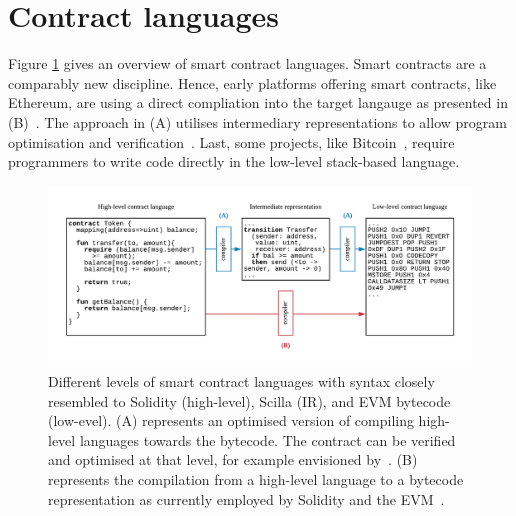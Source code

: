 \section{Contract languages}
\label{languages}

Figure \ref{fig:languagediagram} gives an overview of smart contract languages.
Smart contracts are a comparably new discipline.
Hence, early platforms offering smart contracts, like Ethereum, are using a direct compliation into the target langauge as presented in (B)~\cite{Ethereum2018Solidity,Ethereum2018Vyper}.
The approach in (A) utilises intermediary representations to allow program optimisation and verification~\cite{OCamlProSAS2018,DynamicLedgerSolutions2017,Sergey2018}. 
Last, some projects, like Bitcoin~\cite{BitcoinWiki2018Script}, require programmers to write code directly in the low-level stack-based language.





\begin{figure}
\includegraphics[width=\textwidth]{fig/Language.pdf}
\caption{Different levels of smart contract languages with syntax closely resembled to Solidity (high-level), Scilla (IR), and EVM bytecode (low-evel). (A) represents an optimised version of compiling high-level languages towards the bytecode. The contract can be verified and optimised at that level, for example envisioned by~\cite{Sergey2018,OCamlProSAS2018}. (B) represents the  compilation from a high-level language to a bytecode representation as currently employed by Solidity and the EVM~\cite{Ethereum2018Solidity,Wood2014}.}
\label{fig:languagediagram}
\end{figure}


